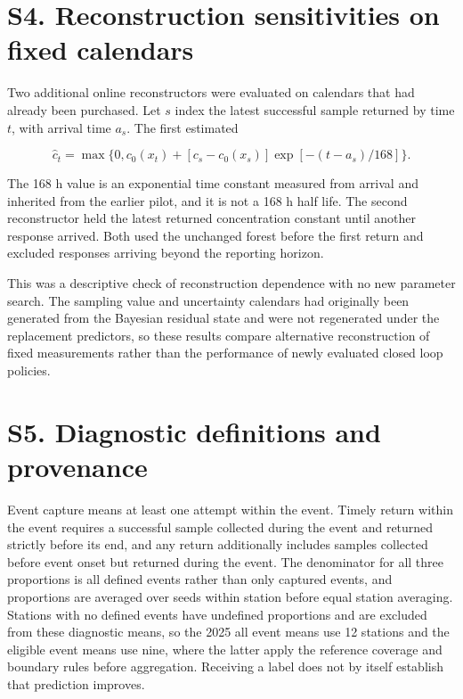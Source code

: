 \documentclass[lineno,pdflatex,sn-apa]{sn-jnl}%
\theoremstyle{thmstyleone}%
\theoremstyle{thmstyletwo}%
\theoremstyle{thmstylethree}%
\begin{document}
\section*{S4. Reconstruction sensitivities on fixed calendars}

Two additional online reconstructors were evaluated on calendars that had already been purchased. Let $s$ index the latest successful sample returned by time $t$, with arrival time $a_s$. The first estimated

\begin{equation}
\widehat c_t=\max\{0,c_0(x_t)+[c_s-c_0(x_s)] \exp[-(t-a_s)/168]\}.
\end{equation}

The 168 h value is an exponential time constant measured from arrival and inherited from the earlier pilot, and it is not a 168 h half life. The second reconstructor held the latest returned concentration constant until another response arrived. Both used the unchanged forest before the first return and excluded responses arriving beyond the reporting horizon.

This was a descriptive check of reconstruction dependence with no new parameter search. The sampling value and uncertainty calendars had originally been generated from the Bayesian residual state and were not regenerated under the replacement predictors, so these results compare alternative reconstruction of fixed measurements rather than the performance of newly evaluated closed loop policies.

\section*{S5. Diagnostic definitions and provenance}

Event capture means at least one attempt within the event. Timely return within the event requires a successful sample collected during the event and returned strictly before its end, and any return additionally includes samples collected before event onset but returned during the event. The denominator for all three proportions is all defined events rather than only captured events, and proportions are averaged over seeds within station before equal station averaging. Stations with no defined events have undefined proportions and are excluded from these diagnostic means, so the 2025 all event means use 12 stations and the eligible event means use nine, where the latter apply the reference coverage and boundary rules before aggregation. Receiving a label does not by itself establish that prediction improves.
\end{document}
